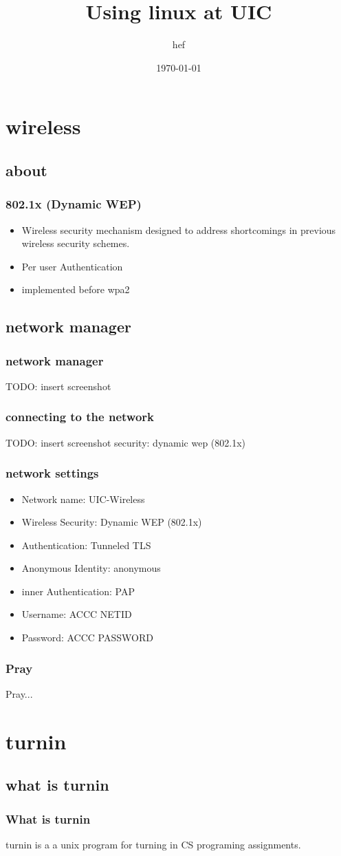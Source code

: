 \documentclass[hyperref={pdfpagelabels=false}]{beamer}
\title{Using linux at UIC}
\author{hef}
\date{\today}
\begin{document}
\frame{\titlepage}
\section[outline]{}
\frame{\tableofcontents}
\section{wireless}
\subsection{about}
\frame
{
    \frametitle{802.1x (Dynamic WEP)}
    \begin{itemize}
    \item{Wireless security mechanism designed to address shortcomings in previous wireless security schemes.}
    \item{Per user Authentication}
    \item{implemented before wpa2}
    \end{itemize}
}
\subsection{network manager}
\frame
{
    \frametitle{network manager}
    TODO: insert screenshot
}
\frame
{
    \frametitle{connecting to the network}
    TODO: insert screenshot
    security: dynamic wep (802.1x)
}
\frame
{
    \frametitle{network settings}
    \begin{itemize}
    \item{Network name: UIC-Wireless}
    \item{Wireless Security: Dynamic WEP (802.1x)}
    \item{Authentication: Tunneled TLS}
    \item{Anonymous Identity: anonymous}
    \item{inner Authentication: PAP}
    \item{Username: ACCC NETID}
    \item{Password: ACCC PASSWORD}
    \end{itemize}
}
\frame
{
    \frametitle{Pray}
    Pray...
}
\section{turnin}
\subsection{what is turnin}
\frame
{
    \frametitle{What is turnin}
    turnin is a a unix program for turning in CS programing assignments.
}
\end{document}
